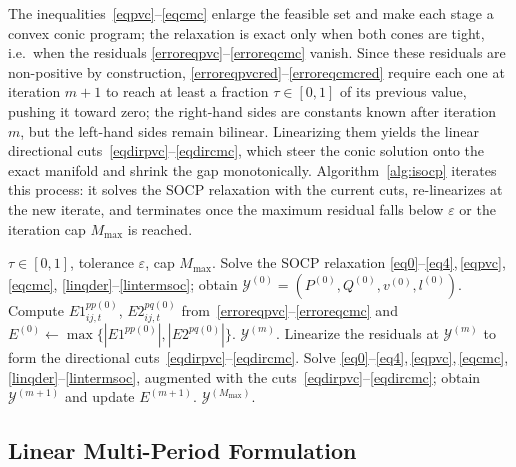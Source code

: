 The inequalities~\eqref{eqpvc}--\eqref{eqcmc} enlarge the feasible set
and make each stage a convex conic program; the relaxation is exact only
when both cones are tight, i.e.\ when the residuals
\eqref{erroreqpvc}--\eqref{erroreqcmc} vanish. Since these residuals are
non-positive by construction, \eqref{erroreqpvcred}--\eqref{erroreqcmcred}
require each one at iteration $m{+}1$ to reach at least a fraction
$\tau\in[0,1]$ of its previous value, pushing it toward zero; the
right-hand sides are constants known after iteration $m$, but the
left-hand sides remain bilinear. Linearizing them yields the linear
directional cuts~\eqref{eqdirpvc}--\eqref{eqdircmc}, which steer the
conic solution onto the exact manifold and shrink the gap monotonically.
Algorithm~\ref{alg:isocp} iterates this process: it solves the SOCP
relaxation with the current cuts, re-linearizes at the new iterate, and
terminates once the maximum residual falls below $\varepsilon$ or the
iteration cap $M_{\max}$ is reached.

\begin{algorithm}[t]
\caption{Multi-Period Iterative SOCP (MPISOCP).}
\label{alg:isocp}
\begin{algorithmic}[1]
\Require $\tau\!\in\![0,1]$, tolerance $\varepsilon$, cap $M_{\max}$.
\State Solve the SOCP relaxation
\eqref{eq0}--\eqref{eq4},\,\eqref{eqpvc},\,\eqref{eqcmc}, \eqref{linqder}--\eqref{lintermsoc}; obtain
$\mathcal{Y}^{(0)}\!=\!(P^{(0)},Q^{(0)},v^{(0)},l^{(0)})$.
\State Compute $E1^{pp(0)}_{ij,t}$, $E2^{pq(0)}_{ij,t}$
from~\eqref{erroreqpvc}--\eqref{erroreqcmc} and
$E^{(0)}\!\leftarrow\!\max\{|E1^{pp(0)}|,|E2^{pq(0)}|\}$.
     \Return $\mathcal{Y}^{(m)}$. \EndIf
        \State Linearize the residuals at $\mathcal{Y}^{(m)}$ to form the
directional cuts~\eqref{eqdirpvc}--\eqref{eqdircmc}.
\State Solve \eqref{eq0}--\eqref{eq4},\,\eqref{eqpvc},\,\eqref{eqcmc},\eqref{linqder}--\eqref{lintermsoc}, augmented with the cuts~\eqref{eqdirpvc}--\eqref{eqdircmc}; obtain
$\mathcal{Y}^{(m+1)}$ and update $E^{(m+1)}$.
\EndFor
\State \Return $\mathcal{Y}^{(M_{\max})}$.
\end{algorithmic}
\end{algorithm}

\subsection{Linear Multi-Period Formulation}
\label{ssec:linear}

